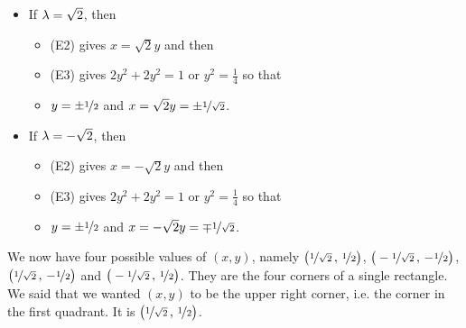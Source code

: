 \begin{eg}
\begin{itemize}
\item If $\lambda=\sqrt{2}$, then 
\begin{itemize}\itemsep1pt \parskip0pt 
\item
(E2) gives $x=\sqrt{2}y$ and then
\item
(E3) gives $2y^2+2y^2=1$ or $y^2=\frac{1}{4}$ so that
\item
$y=\pm\nicefrac{1}{2}$ and $x=\sqrt{2}y=\pm\nicefrac{1}{\sqrt{2}}$.
\end{itemize}


\item If $\lambda=-\sqrt{2}$, then 
\begin{itemize}\itemsep1pt \parskip0pt 
\item
(E2) gives $x=-\sqrt{2}y$ and then
\item
(E3) gives $2y^2+2y^2=1$ or $y^2=\frac{1}{4}$ so that
\item
$y=\pm\nicefrac{1}{2}$ and $x=-\sqrt{2}y=\mp\nicefrac{1}{\sqrt{2}}$.
\end{itemize}

\end{itemize}
We now have four possible values of $(x,y)$, namely
$\big(\nicefrac{1}{\sqrt{2}}\,,\,\nicefrac{1}{2}\big)$,
$\big(-\nicefrac{1}{\sqrt{2}}\,,\,-\nicefrac{1}{2}\big)$,
$\big(\nicefrac{1}{\sqrt{2}}\,,\,-\nicefrac{1}{2}\big)$
and
$\big(-\nicefrac{1}{\sqrt{2}}\,,\,\nicefrac{1}{2}\big)$.
They are the four corners of a single rectangle. We said that we wanted
$(x,y)$ to be the upper right corner, i.e. the corner in the first quadrant.
It is $\big(\nicefrac{1}{\sqrt{2}}\,,\,\nicefrac{1}{2}\big)$. 
\end{eg}

